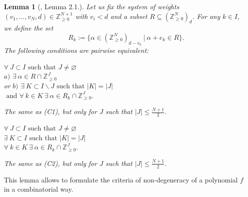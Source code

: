 \documentclass[reqno,12pt]{amsart}
\numberwithin{equation}{section}
\theoremstyle{plain}
\newtheorem{lemma}[theorem]{Lemma}
\theoremstyle{definition}
\newcommand{\ZZ}{{\mathbb{Z}}}
\begin{document}
\begin{lemma}[\cite{HK}, Lemma 2.1.]\label{t2.1}
Let us fix the system of weights $(v_1,...,v_N,d)\in\ZZ_{\geq 0}^{N+1}$ with $v_i<d$ and a subset
$R\subseteq (\ZZ_{\ge 0}^N)_d$. For any $k\in I$, we define the set
$$R_k:= \{\alpha\in (\ZZ_{\ge 0}^N)_{d-v_k}\ |\ \alpha+e_k\in R\}.$$
The following conditions are pairwise equivalent:
\begin{list}{}{}
\item[(C1):] 
\quad $\forall\ J\subset I\text{ such that } J\neq \varnothing$\\
\hspace*{2cm} $a)$ $\exists\ \alpha\in R\cap \ZZ_{\geq 0}^J$\\
\hspace*{1.6cm} or $b)$ $\exists\ K\subset I\backslash J\text{ such that }|K|=|J|$\\
\hspace*{5cm}$\text{ and }\forall\ k\in K\ \exists\ \alpha\in R_k\cap \ZZ_{\geq 0}^J.$\\
\item[(C1)':] 
\quad The same as (C1), but only for $J$ such that $|J|\leq \frac{N+1}{2}$.\\
\item[(C2):] 
\quad $\forall\ J\subset I\text{ such that }J\neq \varnothing$\\
\hspace*{2cm}$\exists\ K\subset I\text{ such that }|K|=|J|$\\
\hspace*{4cm}$\forall\ k\in K\ \exists\ \alpha\in R_k\cap \ZZ_{\geq 0}^J.$\\
\item[(C2)':] 
\quad The same as (C2), but only for $J$ such that $|J|\leq \frac{N+1}{2}$.
\end{list}
\end{lemma}
This lemma allows to formulate the criteria of non-degeneracy of a polynomial $f$ in a combinatorial way.
\end{document}
